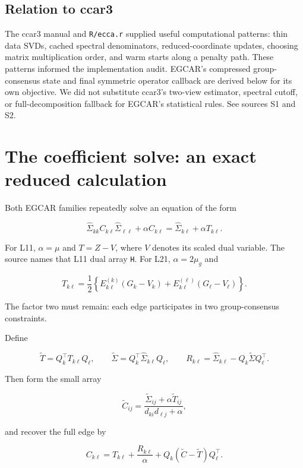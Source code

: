 \documentclass[
  11pt,
]{article}
\begin{document}
\hypertarget{relation-to-ccar3}{%
\subsection{Relation to ccar3}\label{relation-to-ccar3}}

The ccar3 manual and \texttt{R/ecca.r} supplied useful computational
patterns: thin data SVDs, cached spectral denominators,
reduced-coordinate updates, choosing matrix multiplication order, and
warm starts along a penalty path. These patterns informed the
implementation audit. EGCAR's compressed group-consensus state and final
symmetric operator callback are derived below for its own objective. We
did not substitute ccar3's two-view estimator, spectral cutoff, or
full-decomposition fallback for EGCAR's statistical rules. See sources
S1 and S2.

\hypertarget{the-coefficient-solve-an-exact-reduced-calculation}{%
\section{The coefficient solve: an exact reduced
calculation}\label{the-coefficient-solve-an-exact-reduced-calculation}}

Both EGCAR families repeatedly solve an equation of the form

\[
\widehat\Sigma_{kk}C_{k\ell}\widehat\Sigma_{\ell\ell}
+\alpha C_{k\ell}
=\widehat\Sigma_{k\ell}+\alpha T_{k\ell}.
\tag{1}
\]

For L11, \(\alpha=\mu\) and \(T=Z-V\), where \(V\) denotes its scaled
dual variable. The source names that L11 dual array \texttt{H}. For L21,
\(\alpha=2\mu_g\) and

\[
T_{k\ell}=\frac12\left\{
E_{k\ell}^{(k)}(G_k-V_k)+E_{k\ell}^{(\ell)}(G_\ell-V_\ell)
\right\}.
\tag{2}
\]

The factor two must remain: each edge participates in two
group-consensus constraints.

Define

\[
\widetilde T=Q_k^\top T_{k\ell}Q_\ell,
\qquad \widetilde\Sigma=Q_k^\top\widehat\Sigma_{k\ell}Q_\ell,
\qquad R_{k\ell}=\widehat\Sigma_{k\ell}-Q_k\widetilde\Sigma Q_\ell^\top.
\]

Then form the small array

\[
\widetilde C_{ij}
=\frac{\widetilde\Sigma_{ij}+\alpha\widetilde T_{ij}}
       {d_{ki}d_{\ell j}+\alpha},
\tag{3}
\]

and recover the full edge by

\[
C_{k\ell}=T_{k\ell}+\frac{R_{k\ell}}{\alpha}
+Q_k(\widetilde C-\widetilde T)Q_\ell^\top.
\tag{4}
\]
\end{document}
